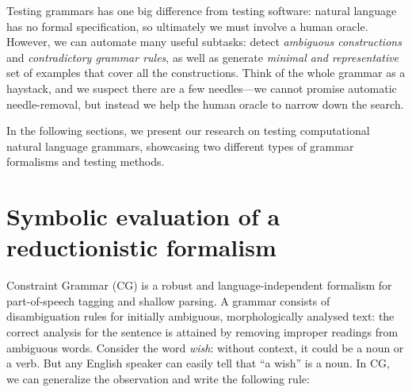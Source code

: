 


Testing grammars has one big difference from testing software: natural language has no formal specification, 
so ultimately we must involve a human oracle. However, we can automate many useful subtasks: detect \emph{ambiguous constructions} and \emph{contradictory grammar rules}, as well as generate \emph{minimal and representative} set of examples that cover all the constructions. 
Think of the whole grammar as a haystack, and we suspect there are a few needles---we cannot promise automatic needle-removal, but instead we help the human oracle to narrow down the search.

In the following sections, we present our research on testing computational natural language grammars, showcasing two different types of grammar formalisms and testing methods.

\section{Symbolic evaluation of a reductionistic formalism}

Constraint Grammar (CG) \cite{karlsson1995constraint} is a robust and language-independent formalism 
for part-of-speech tagging and shallow parsing. 
A grammar consists of disambiguation rules for initially ambiguous, 
morphologically analysed text: the correct analysis for the sentence 
is attained by removing improper readings from ambiguous words.
Consider the word \emph{wish}: without context, it could be a noun or a verb.
But any English speaker can easily tell that ``a wish'' is a noun.
In CG, we can generalize the observation and write the following rule:

